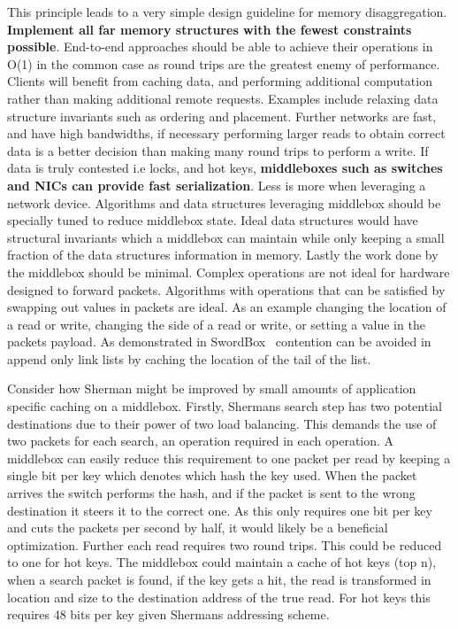 This principle leads to a very simple design guideline for memory
disaggregation. \textbf{Implement all far memory structures with the fewest
constraints possible}. End-to-end approaches should be able to achieve their
operations in O(1) in the common case as round trips are the greatest enemy of
performance.  Clients will benefit from caching data, and performing additional
computation rather than making additional remote requests. Examples include
relaxing data structure invariants such as ordering and placement. Further
networks are fast, and have high bandwidths, if necessary performing larger
reads to obtain correct data is a better decision than making many round trips
to perform a write. If data is truly contested i.e locks, and hot keys,
\textbf{middleboxes such as switches and NICs can provide fast serialization}.
Less is more when leveraging a network device. Algorithms and data structures
leveraging middlebox should be specially tuned to reduce middlebox state. Ideal
data structures would have structural invariants which a middlebox can maintain
while only keeping a small fraction of the data structures information in
memory. Lastly the work done by the middlebox should be minimal. Complex
operations are not ideal for hardware designed to forward packets. Algorithms
with operations that can be satisfied by swapping out values in packets are
ideal. As an example changing the location of a read or write, changing the side
of a read or write, or setting a value in the packets payload. As demonstrated
in SwordBox~\cite{Grant2021InContRes} contention can be avoided in append only
link lists by caching the location of the tail of the list.


Consider how Sherman might be improved by small amounts of application specific
caching on a middlebox. Firstly, Shermans search step has two potential
destinations due to their power of two load balancing. This demands the use of
two packets for each search, an operation required in each operation. A
middlebox can easily reduce this requirement to one packet per read by keeping a
single bit per key which denotes which hash the key used. When the packet
arrives the switch performs the hash, and if the packet is sent to the wrong
destination it steers it to the correct one. As this only requires one bit per
key and cuts the packets per second by half, it would likely be a beneficial
optimization. Further each read requires two round trips. This could be reduced
to one for hot keys. The middlebox could maintain a cache of hot keys (top n),
when a search packet is found, if the key gets a hit, the read is transformed in
location and size to the destination address of the true read. For hot keys this
requires 48 bits per key given Shermans addressing scheme.

